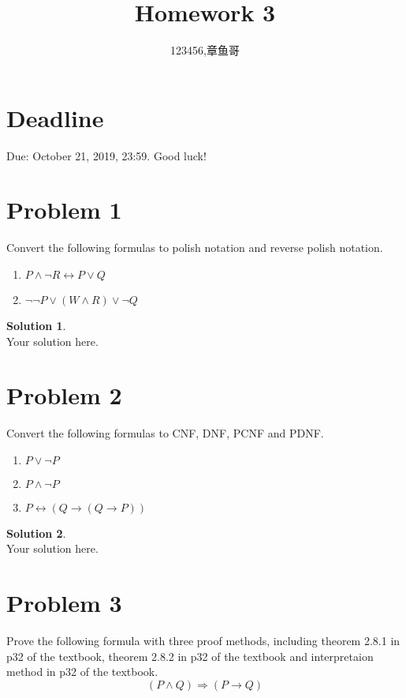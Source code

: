 \documentclass[a4paper,UTF8]{article}
\theoremstyle{definition}
\newtheorem*{solution}{Solution}
\begin{document}
\title{Homework 3}
\author{123456,章鱼哥}
\maketitle

\section*{Deadline}
Due: October 21, 2019, 23:59. Good luck!


\section*{Problem 1}
Convert the following formulas to polish notation and reverse polish notation.
\begin{enumerate}
\item $P\wedge\neg R\leftrightarrow P\vee Q$
\item $\neg\neg P\vee(W\wedge R)\vee\neg Q$
\end{enumerate}

\begin{solution}
~\\
Your solution here.
\end{solution}

\section*{Problem 2}
Convert the following formulas to CNF, DNF, PCNF and PDNF.
\begin{enumerate}
\item $P\vee\neg P$
\item $P\wedge\neg P$
\item $P\leftrightarrow( Q\rightarrow(Q\rightarrow P) )$
\end{enumerate}

\begin{solution}
~\\
Your solution here.
\end{solution}


\section*{Problem 3}
Prove the following formula with three proof methods, including theorem 2.8.1 in p32 of the textbook, theorem 2.8.2 in p32 of the textbook and interpretaion method in p32 of the textbook.
\[
(P\wedge Q)\Rightarrow(P\rightarrow Q)
\]
\end{document}
